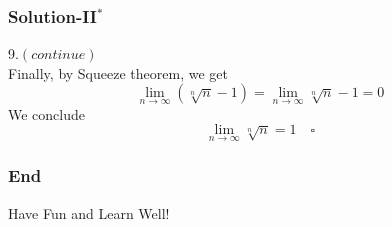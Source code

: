 \documentclass[12pt, t]{beamer}
\begin{document}
\begin{frame}
    \frametitle{Solution-II$^*$}
9.$(continue)$\\
\hspace{1em} Finally, by Squeeze theorem, we get 
\begin{equation*}
    \lim_{n\rightarrow\infty}(\sqrt[n]{n}-1)=\lim_{n\rightarrow\infty}\sqrt[n]{n}-1=0
\end{equation*}
\hspace{1em} We conclude
\begin{equation*}
    \lim_{n\rightarrow\infty}\sqrt[n]{n}=1\quad\square
\end{equation*}
\end{frame}


\begin{frame}
    \frametitle{End}
    \vspace{2cm}
    \Huge \center  Have Fun and Learn Well!
\end{frame}
\end{document}
